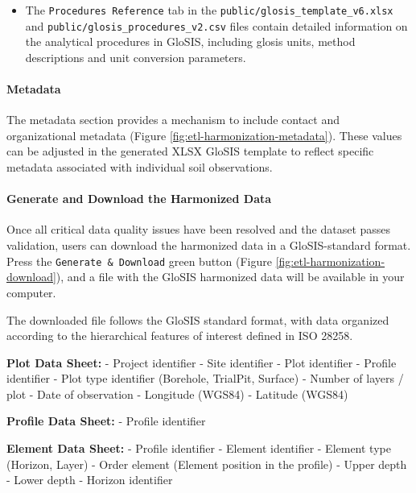 \documentclass[
  10pt,
  b5paper,
  oneside]{book}
\providecommand{\tightlist}{%
  \setlength{\itemsep}{0pt}\setlength{\parskip}{0pt}}
\begin{document}
\begin{itemize}
\tightlist
\item
  The \texttt{Procedures\ Reference} tab in the \texttt{public/glosis\_template\_v6.xlsx} and \texttt{public/glosis\_procedures\_v2.csv} files contain detailed information on the analytical procedures in GloSIS, including glosis units, method descriptions and unit conversion parameters.
\end{itemize}

\paragraph*{Metadata}\label{metadata}

The metadata section provides a mechanism to include contact and organizational metadata (Figure \ref{fig:etl-harmonization-metadata}). These values can be adjusted in the generated XLSX GloSIS template to reflect specific metadata associated with individual soil observations.

\paragraph*{Generate and Download the Harmonized Data}\label{generate-and-download-the-harmonized-data}

Once all critical data quality issues have been resolved and the dataset passes validation, users can download the harmonized data in a GloSIS-standard format. Press the \texttt{Generate\ \&\ Download} green button (Figure \ref{fig:etl-harmonization-download}), and a file with the GloSIS harmonized data will be available in your computer.

The downloaded file follows the GloSIS standard format, with data organized according to the hierarchical features of interest defined in ISO 28258.

\textbf{Plot Data Sheet:} - Project identifier - Site identifier - Plot identifier - Profile identifier - Plot type identifier (Borehole, TrialPit, Surface) - Number of layers / plot - Date of observation - Longitude (WGS84) - Latitude (WGS84)

\textbf{Profile Data Sheet:} - Profile identifier

\textbf{Element Data Sheet:} - Profile identifier - Element identifier - Element type (Horizon, Layer) - Order element (Element position in the profile) - Upper depth - Lower depth - Horizon identifier
\end{document}
